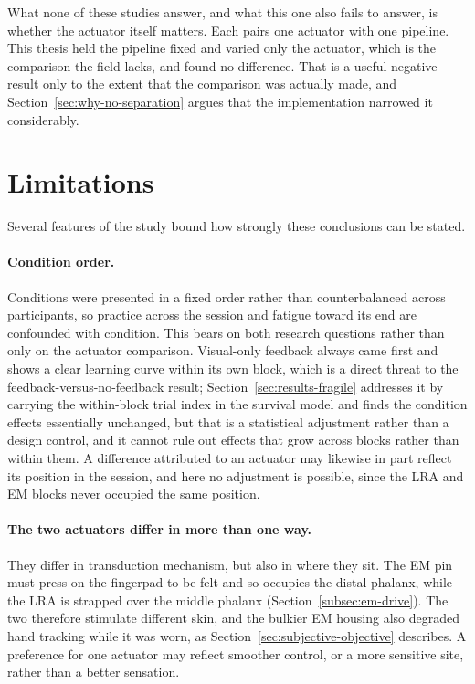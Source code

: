 \documentclass[12pt, a4paper, twoside, openright]{report}
\begin{document}
What none of these studies answer, and what this one also fails to answer, is
whether the actuator itself matters. Each pairs one actuator with one pipeline.
This thesis held the pipeline fixed and varied only the actuator, which is the
comparison the field lacks, and found no difference. That is a useful negative
result only to the extent that the comparison was actually made, and
Section~\ref{sec:why-no-separation} argues that the implementation narrowed it
considerably.

\section{Limitations}
\label{sec:limitations}

Several features of the study bound how strongly these conclusions can be
stated.

\paragraph{Condition order.} Conditions were presented in a fixed order rather
than counterbalanced across participants, so practice across the session and
fatigue toward its end are confounded with condition. This bears on both
research questions rather than only on the actuator comparison. Visual-only
feedback always came first and shows a clear learning curve within its own
block, which is a direct threat to the feedback-versus-no-feedback result;
Section~\ref{sec:results-fragile} addresses it by carrying the within-block
trial index in the survival model and finds the condition effects essentially
unchanged, but that is a statistical adjustment rather than a design control,
and it cannot rule out effects that grow across blocks rather than within them.
A difference attributed to an actuator may likewise in part reflect its
position in the session, and here no adjustment is possible, since the LRA and
EM blocks never occupied the same position.

\paragraph{The two actuators differ in more than one way.} They differ in
transduction mechanism, but also in where they sit. The EM pin must press on
the fingerpad to be felt and so occupies the distal phalanx, while the LRA is
strapped over the middle phalanx (Section~\ref{subsec:em-drive}). The two
therefore stimulate different skin, and the bulkier EM housing also degraded
hand tracking while it was worn, as Section~\ref{sec:subjective-objective}
describes. A preference for one actuator may reflect smoother control, or a
more sensitive site, rather than a better sensation.
\end{document}
